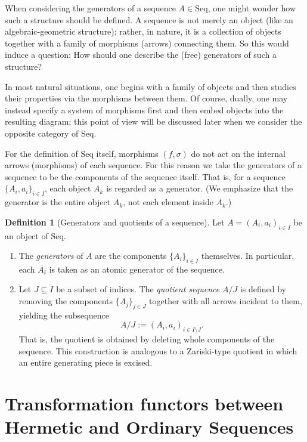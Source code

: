 \documentclass[11pt]{book}
\theoremstyle{definition}
\newtheorem{definition}{Definition}[section]
\theoremstyle{plain}
\theoremstyle{remark}
\begin{document}
When considering the generators of a sequence \(A\in\mathrm{Seq}\), one might wonder how such a structure
should be defined. A sequence is not merely an object (like an algebraic-geometric structure); rather, in nature,
it is a collection of objects together with a family of morphisms (arrows) connecting them. So this would induce a question: How should one 
describe the (free) generators of such a structure?

In most natural situations, one begins with a family of objects and then studies their properties via
the morphisms between them. Of course, dually, one may instead specify a system of morphisms first and then
embed objects into the resulting diagram; this point of view will be discussed later when we consider
the opposite category of \(\mathrm{Seq}\).

For the definition of \(\mathrm{Seq}\) itself, morphisms \((f,\sigma)\) do not act on the internal arrows (morphisms) of each
sequence. For this reason we take the generators of a sequence to be the components of the
sequence itself. That is, for a sequence \(\{A_i,a_i\}_{i\in I}\), each object \(A_k\) is regarded as a generator.
(We emphasize that the generator is the entire object \(A_k\), not each element inside \(A_k\).)

\begin{definition}[Generators and quotients of a sequence]\label{def:1.1.4}
Let \(A=(A_i,a_i)_{i\in I}\) be an object of \(\mathrm{Seq}\).

\begin{enumerate}
    \item The \emph{generators} of \(A\) are the components \(\{A_i\}_{i\in I}\) themselves.
    In particular, each \(A_i\) is taken as an atomic generator of the sequence.

    \item Let \(J\subseteq I\) be a subset of indices.  
    The \emph{quotient sequence} \(A/J\) is defined by removing the components
    \(\{A_j\}_{j\in J}\) together with all arrows incident to them, yielding the subsequence
    \[
        A/J := (A_i,a_i)_{i\in I\setminus J}.
    \]
    That is, the quotient is obtained by deleting whole components of the sequence.
    This construction is analogous to a Zariski-type quotient in which an entire
    generating piece is excised.
\end{enumerate}

\end{definition}


\chapter{Transformation functors between Hermetic and Ordinary Sequences}
\end{document}
